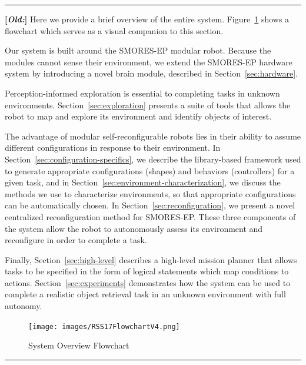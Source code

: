 \documentclass[conference]{IEEEtran}
\newcommand{\separator}{ \noindent \rule{\columnwidth}{1pt} }
\newenvironment{old}{\color{Maroon} \separator \textbf{[\textit{Old:}]} }{\ignorespacesafterend \separator}
\begin{document}
\begin{old}
Here we provide a brief overview of the entire system.  Figure~\ref{fig:overview} shows a flowchart which serves as a visual companion to this section. 

Our system is built around the SMORES-EP modular robot. Because the modules cannot sense their environment, we extend the SMORES-EP hardware system by introducing a novel brain module, described in Section~\ref{sec:hardware}.

Perception-informed exploration is essential to completing tasks in unknown environments.  Section~\ref{sec:exploration} presents a suite of tools that allows the robot to map and explore its environment and identify objects of interest. 

The advantage of modular self-reconfigurable robots lies in their ability to assume different configurations in response to their environment.  In Section~\ref{sec:configuration-specifics}, we describe the library-based framework used to generate appropriate configurations (shapes) and behaviors (controllers) for a given task, and in Section~\ref{sec:environment-characterization}, we discuss the methods we use to characterize environments, so that appropriate configurations can be automatically chosen.  In Section~\ref{sec:reconfiguration}, we present a novel centralized reconfiguration method for SMORES-EP.  These three components of the system allow the robot to autonomously assess its environment and reconfigure in order to complete a task.

Finally, Section~\ref{sec:high-level} describes a high-level mission planner that allows tasks to be specified in the form of logical statements which map conditions to actions.  Section~\ref{sec:experiments} demonstrates how the system can be used to complete a realistic object retrieval task in an unknown environment with full autonomy. 
%
\begin{figure}
\begin{center}
\texttt{[image: images/RSS17FlowchartV4.png]}
\caption{System Overview Flowchart}
\label{fig:overview}
\end{center}
\vspace{-1em}
\end{figure}
\end{old} 
%
\end{document}
